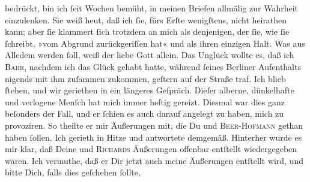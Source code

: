 \begin{ledgroupsized}[t]{13cm}
               bedrückt, bin ich ſeit Wochen bemüht, in meinen Briefen allmälig zur Wahrheit
               einzulenken. Sie weiß heut, daß ich ſie, fürs Erſte wenigſtens, nicht heirathen kann;
               aber ſie klammert ſich trotzdem an mich als  denjenigen, der ſie, wie ſie ſchreibt, »vom Abgrund zurückgeriſſen hat« und
               als ihren einzigen Halt.\pend
           \pstart
           Was aus Alledem werden ſoll, weiß der liebe Gott allein.\pend
           \pstart
           Das Unglück wollte es, daß {\pb} ich \textsc{Bahr}, nachdem ich das Glück gehabt hatte,  während ſeines Berliner Aufenthalts
               nigends mit ihm zuſammen zukommen, \introOben{}geſtern\introOben{} auf der Straße traf. Ich blieb ſtehen, und wir geriethen in ein längeres
               Geſpräch. Dieſer alberne, dünkelhafte und verlogene Menſch hat  mich immer heftig gereizt. Diesmal war dies ganz
               beſonders der Fall, und er ſchien es auch darauf angelegt zu haben, mich zu
               provoziren. So theilte er mir Äußerungen mit, die Du und \textsc{Beer-Hofmann} gethan haben ſollen. Ich gerieth in Hitze und antwortete {\pb}demgemäß. Hinterher wurde es mir klar, daß Deine und
                  \textsc{Richards} Äußerungen offenbar entſtellt
               wiedergegeben waren. Ich vermuthe, daß er Dir jetzt auch meine Äußerungen entſtellt \label{K_L03389-11v}\label{K_L03389-11h} wird, und bitte Dich, falls dies geſchehen ſollte,

\end{ledgroupsized}
